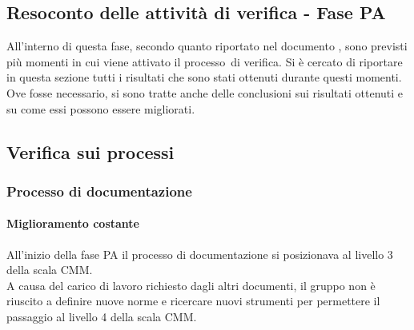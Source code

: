 \documentclass[../PianoDiQualifica.tex]{subfiles}
\begin{document}
\begin{appendices}
\section{Resoconto delle attività di verifica - Fase PA}
All'interno di questa fase\g, secondo quanto riportato nel documento \pianodiprogetto, sono previsti più momenti in cui viene attivato il processo\g\ di verifica. Si è cercato di riportare in questa sezione tutti i risultati che sono stati ottenuti durante questi momenti. Ove fosse necessario, si sono tratte anche delle conclusioni sui risultati ottenuti e su come essi possono essere migliorati.
	
	\subsection{Verifica sui processi}
		\subsubsection{Processo di documentazione}
			\paragraph{Miglioramento costante}
			All'inizio della fase PA il processo di documentazione si posizionava al livello 3 della scala CMM.\\
			A causa del carico di lavoro richiesto dagli altri documenti, il gruppo non è riuscito a definire nuove norme e ricercare nuovi strumenti per permettere il passaggio al livello 4 della scala CMM.
			

\end{appendices}
\end{document}
